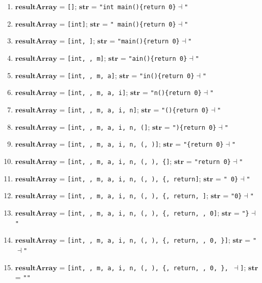 \begin{enumerate}
    \item \(\boldsymbol{resultArray}\) = \texttt{[]}; \hfill \(\boldsymbol{str}\) = \texttt{"int main()\{return 0\}\( \dashv \)"}
    \item \(\boldsymbol{resultArray}\) = \texttt{[int]}; \hfill \(\boldsymbol{str}\) = \texttt{" main()\{return 0\}\( \dashv \)"}
    \item \(\boldsymbol{resultArray}\) = \texttt{[int,  ]}; \hfill \(\boldsymbol{str}\) = \texttt{"main()\{return 0\}\( \dashv \)"}
    \item \(\boldsymbol{resultArray}\) = \texttt{[int,  , m]}; \hfill \(\boldsymbol{str}\) = \texttt{"ain()\{return 0\}\( \dashv \)"}
    \item \(\boldsymbol{resultArray}\) = \texttt{[int,  , m, a]}; \hfill \(\boldsymbol{str}\) = \texttt{"in()\{return 0\}\( \dashv \)"}
    \item \(\boldsymbol{resultArray}\) = \texttt{[int,  , m, a, i]}; \hfill \(\boldsymbol{str}\) = \texttt{"n()\{return 0\}\( \dashv \)"}
    \item \(\boldsymbol{resultArray}\) = \texttt{[int,  , m, a, i, n]}; \hfill \(\boldsymbol{str}\) = \texttt{"()\{return 0\}\( \dashv \)"}
    \item \(\boldsymbol{resultArray}\) = \texttt{[int,  , m, a, i, n, (]}; \hfill \(\boldsymbol{str}\) = \texttt{")\{return 0\}\( \dashv \)"}
    \item \(\boldsymbol{resultArray}\) = \texttt{[int,  , m, a, i, n, (, )]}; \hfill \(\boldsymbol{str}\) = \texttt{"\{return 0\}\( \dashv \)"}
    \item \(\boldsymbol{resultArray}\) = \texttt{[int,  , m, a, i, n, (, ), \{]}; \hfill \(\boldsymbol{str}\) = \texttt{"return 0\}\( \dashv \)"}
    \item \(\boldsymbol{resultArray}\) = \texttt{[int,  , m, a, i, n, (, ), \{, return]}; \hfill \(\boldsymbol{str}\) = \texttt{" 0\}\( \dashv \)"}
    \item \(\boldsymbol{resultArray}\) = \texttt{[int,  , m, a, i, n, (, ), \{, return,  ]}; \hfill \(\boldsymbol{str}\) = \texttt{"0\}\( \dashv \)"}
    \item \(\boldsymbol{resultArray}\) = \texttt{[int,  , m, a, i, n, (, ), \{, return,  , 0]}; \hfill \(\boldsymbol{str}\) = \texttt{"\}\( \dashv \)"}
    \item \(\boldsymbol{resultArray}\) = \texttt{[int,  , m, a, i, n, (, ), \{, return,  , 0, \}]}; \hfill \(\boldsymbol{str}\) = \texttt{"\( \dashv \)"}
    \item \(\boldsymbol{resultArray}\) = \texttt{[int,  , m, a, i, n, (, ), \{, return,  , 0, \}, \( \dashv \)]}; \hfill \(\boldsymbol{str}\) = \texttt{""}
\end{enumerate}

